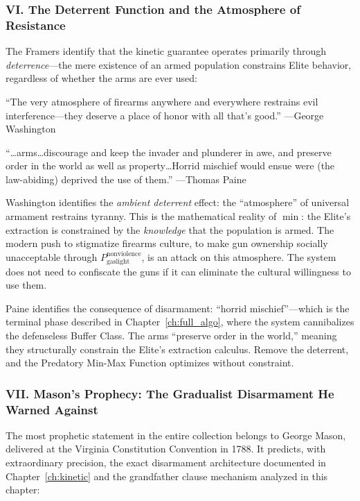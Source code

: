 \subsubsection*{VI. The Deterrent Function and the Atmosphere of Resistance}

The Framers identify that the kinetic guarantee operates primarily through \textit{deterrence}---the mere existence of an armed population constrains Elite behavior, regardless of whether the arms are ever used:

\begin{historicalsource}
``The very atmosphere of firearms anywhere and everywhere restrains evil interference---they deserve a place of honor with all that's good.'' \hfill ---George Washington

\medskip
``\ldots arms\ldots discourage and keep the invader and plunderer in awe, and preserve order in the world as well as property\ldots Horrid mischief would ensue were (the law-abiding) deprived the use of them.'' \hfill ---Thomas Paine
\end{historicalsource}

Washington identifies the \textit{ambient deterrent} effect: the ``atmosphere'' of universal armament restrains tyranny. This is the mathematical reality of $\min$: the Elite's extraction is constrained by the \textit{knowledge} that the population is armed. The modern push to stigmatize firearms culture, to make gun ownership socially unacceptable through $P_{\text{gaslight}}^{\text{nonviolence}}$, is an attack on this atmosphere. The system does not need to confiscate the guns if it can eliminate the cultural willingness to use them.

Paine identifies the consequence of disarmament: ``horrid mischief''---which is the terminal phase described in Chapter~\ref{ch:full_algo}, where the system cannibalizes the defenseless Buffer Class. The arms ``preserve order in the world,'' meaning they structurally constrain the Elite's extraction calculus. Remove the deterrent, and the Predatory Min-Max Function optimizes without constraint.

\subsubsection*{VII. Mason's Prophecy: The Gradualist Disarmament He Warned Against}

The most prophetic statement in the entire collection belongs to George Mason, delivered at the Virginia Constitution Convention in 1788. It predicts, with extraordinary precision, the exact disarmament architecture documented in Chapter~\ref{ch:kinetic} and the grandfather clause mechanism analyzed in this chapter:

